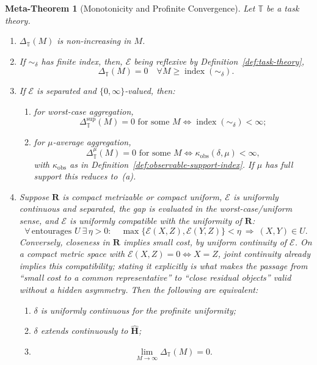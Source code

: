 \documentclass[12pt]{article}
\newtheorem{metatheorem}[theorem]{Meta-Theorem}
\theoremstyle{definition}
\begin{document}
\begin{metatheorem}[Monotonicity and Profinite Convergence]
\label{meta:monotone}
Let $\mathbb T$ be a task theory.
\begin{enumerate}[label=(\roman*)]
\item $\Delta_{\mathbb T}(M)$ is non-increasing in $M$.
\item If $\sim_\delta$ has finite index, then, $\mathcal E$ being reflexive by
Definition~\ref{def:task-theory},
\[
\Delta_{\mathbb T}(M)=0
\quad
\forall M\ge\operatorname{index}(\sim_\delta).
\]
\item If $\mathcal E$ is separated and $\{0,\infty\}$-valued, then:
\begin{enumerate}[label=(\alph*)]
\item for worst-case aggregation,
\[
\Delta_{\mathbb T}^{\sup}(M)=0
\text{ for some }M
\iff
\operatorname{index}(\sim_\delta)<\infty;
\]
\item for $\mu$-average aggregation,
\[
\Delta_{\mathbb T}^{\mu}(M)=0
\text{ for some }M
\iff
\kappa_{\mathrm{obs}}(\delta,\mu)<\infty,
\]
with $\kappa_{\mathrm{obs}}$ as in
Definition~\ref{def:observable-support-index}.  If $\mu$ has full support this
reduces to~(a).
\end{enumerate}
\item Suppose $\mathbf R$ is compact metrizable or compact uniform,
$\mathcal E$ is uniformly continuous and separated, the gap is evaluated in
the worst-case/uniform sense, and $\mathcal E$ is \emph{uniformly compatible}
with the uniformity of $\mathbf R$:
\[
\forall\,\text{entourages }U\ \exists\,\eta>0:\quad
\max\{\mathcal E(X,Z),\mathcal E(Y,Z)\}<\eta
\ \Longrightarrow\ (X,Y)\in U .
\]
Conversely, closeness in $\mathbf R$ implies small cost, by uniform continuity
of $\mathcal E$.  On a compact metric space with
$\mathcal E(X,Z)=0\iff X=Z$, joint continuity already implies this
compatibility; stating it explicitly is what makes the passage from ``small
cost to a common representative'' to ``close residual objects'' valid without
a hidden asymmetry.  Then the following are equivalent:
\begin{enumerate}[label=(\alph*)]
\item $\delta$ is uniformly continuous for the profinite uniformity;
\item $\delta$ extends continuously to $\widehat{\mathbf H}$;
\item
\[
\lim_{M\to\infty}\Delta_{\mathbb T}(M)=0.
\]
\end{enumerate}
\end{enumerate}
\end{metatheorem}
\end{document}
